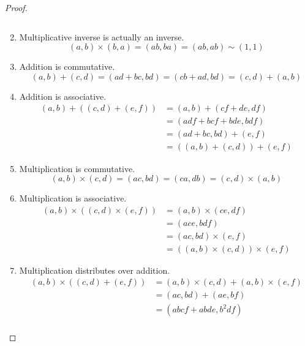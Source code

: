 \begin{proof}
\begin{enumerate}
\begin{equation}
      \end{equation}
      \item Multiplicative inverse is actually an inverse. 
      \begin{equation}
        (a, b) \times (b, a) = (ab, ba) = (ab, ab) \sim (1, 1)
      \end{equation}
      \item Addition is commutative. 
      \begin{equation}
        (a, b) + (c, d) = (ad + bc, bd) = (cb + ad, bd) = (c, d) + (a, b)
      \end{equation}
      \item Addition is associative. 
      \begin{align}
        (a, b) + ((c, d) + (e, f)) & = (a, b) + (cf + de, df) \\
                                   & = (adf + bcf + bde, bdf) \\
                                   & = (ad + bc, bd) + (e, f) \\
                                   & = ((a, b) + (c, d)) + (e, f)
      \end{align}
      \item Multiplication is commutative. 
      \begin{equation}
        (a, b) \times (c, d) = (ac, bd) = (ca, db) = (c, d) \times (a, b)
      \end{equation}
      \item Multiplication is associative. 
      \begin{align}
        (a, b) \times ((c, d) \times (e, f)) & = (a, b) \times (ce, df) \\ 
                                             & = (ace, bdf) \\
                                             & = (ac, bd) \times (e, f) \\
                                             & = ((a, b) \times (c, d)) \times (e, f)
      \end{align}
      \item Multiplication distributes over addition. 
        \begin{align}
          (a, b) \times ((c, d) + (e, f)) & = (a, b) \times (c, d) + (a, b) \times (e, f) \\
                                          & = (ac, bd) + (ae, bf) \\
                                          & = (abcf + abde, b^2 df) \\

\end{align}
\end{enumerate}
\end{proof}

